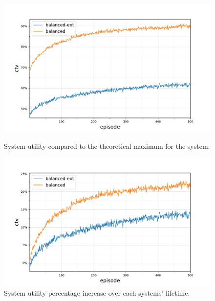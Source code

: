 \begin{figure}[ht]
\begin{minipage}{.49\textwidth}
    \centering
    \includegraphics[width=1.0\linewidth,trim={25pt 0pt 50pt 0pt},clip]{5balanced_ctv-optimal-ctv}
    \captionsetup{labelfont=bf,singlelinecheck=on}
    \caption{System utility compared to the theoretical \newline maximum for the \simulationSimple{}{} system.}
    \label{fig:5_ctvoptimalctv}
\end{minipage}\hfill%
\begin{minipage}{.49\textwidth}
	\centering
	\includegraphics[width=1.0\linewidth,trim={25pt 0pt 50pt 0pt},clip]{5balanced_ctv-optimal-ctv-gain}
	\captionsetup{labelfont=bf,singlelinecheck=on}
	\caption{System utility percentage increase over each \newline systems' lifetime.}
	\label{fig:5_ctv-optimal-ctv-gain}
\end{minipage}
\end{figure}

